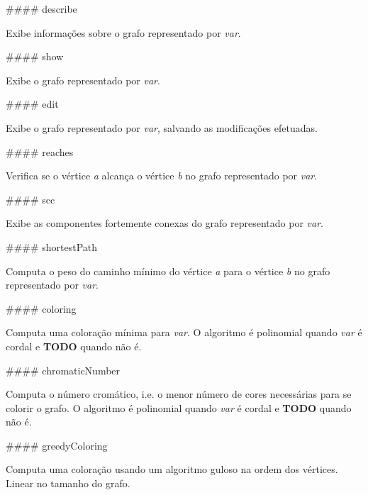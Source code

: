 \#\#\#\# describe 
\begin{DoxyCode}{0}
\end{DoxyCode}
 Exibe informações sobre o grafo representado por {\itshape var}.

\#\#\#\# show 
\begin{DoxyCode}{0}
\end{DoxyCode}
 Exibe o grafo representado por {\itshape var}.

\#\#\#\# edit 
\begin{DoxyCode}{0}
\end{DoxyCode}
 Exibe o grafo representado por {\itshape var}, salvando as modificações efetuadas.

\#\#\#\# reaches 
\begin{DoxyCode}{0}
\end{DoxyCode}
 Verifica se o vértice {\itshape a} alcança o vértice {\itshape b} no grafo representado por {\itshape var}.

\#\#\#\# scc 
\begin{DoxyCode}{0}
\end{DoxyCode}
 Exibe as componentes fortemente conexas do grafo representado por {\itshape var}.

\#\#\#\# shortest\+Path 
\begin{DoxyCode}{0}
\end{DoxyCode}
 Computa o peso do caminho mínimo do vértice {\itshape a} para o vértice {\itshape b} no grafo representado por {\itshape var}.

\#\#\#\# coloring 
\begin{DoxyCode}{0}
\end{DoxyCode}
 Computa uma coloração mínima para {\itshape var}. O algoritmo é polinomial quando {\itshape var} é cordal e {\bfseries{T\+O\+DO}} quando não é.

\#\#\#\# chromatic\+Number 
\begin{DoxyCode}{0}
\end{DoxyCode}
 Computa o número cromático, i.\+e. o menor número de cores necessárias para se colorir o grafo. O algoritmo é polinomial quando {\itshape var} é cordal e {\bfseries{T\+O\+DO}} quando não é.

\#\#\#\# greedy\+Coloring 
\begin{DoxyCode}{0}
\end{DoxyCode}
 Computa uma coloração usando um algoritmo guloso na ordem dos vértices. Linear no tamanho do grafo.

